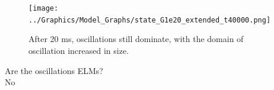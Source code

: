 \documentclass[10pt]{beamer}
\begin{document}
\begin{frame} %

\begin{figure}[h]
\begin{minipage}{0.69\linewidth}
	\texttt{[image: ../Graphics/Model\_Graphs/state\_G1e20\_extended\_t40000.png]}
\end{minipage}
\begin{minipage}{0.29\linewidth}
	\caption{After 20 ms, oscillations still dominate, with the domain of oscillation increased in size.}
\end{minipage}
\end{figure}

\end{frame}

\begin{frame} %
\centering
Are the oscillations ELMs? \\
\Huge No
\end{frame}
\end{document}
